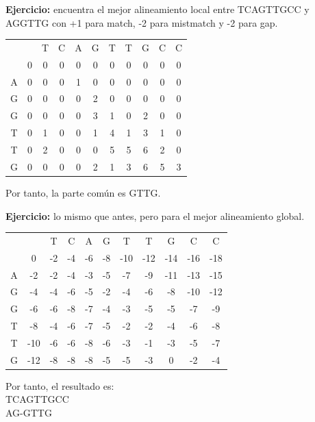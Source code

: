 \begin{table}[h]
\begin{mdframed}[backgroundcolor=black!10]
\textbf{Ejercicio:} encuentra el mejor alineamiento local entre TCAGTTGCC y AGGTTG con +1 para match, -2 para mistmatch y -2 para gap.

\begin{tabular}{c c c c c c c c c c c}
&&T&C&A&G&T&T&G&C&C\\
&0&0&0&0&0&0&0&0&0&0\\
A &0 &0&0&1&0&0&0&0&0&0\\
G &0 &0&0&0&2&0&0&0&0&0\\ 
G &0 &0&0&0&3&1&0&2&0&0\\ 
T &0 &1&0&0&1&4&1&3&1&0\\ 
T &0 &2&0&0&0&5&5&6&2&0\\ 
G &0 &0&0&0&2&1&3&6&5&3\\ 
\end{tabular}

Por tanto, la parte común es GTTG.

\textbf{Ejercicio:} lo mismo que antes, pero para el mejor alineamiento global.
\begin{tabular}{c c c c c c c c c c c}
&&T&C&A&G&T&T&G&C&C\\
&0&-2&-4&-6&-8&-10&-12&-14&-16&-18\\
A &-2 &-2&-4&-3&-5&-7&-9&-11&-13&-15\\
G &-4 &-4&-6&-5&-2&-4&-6&-8&-10&-12\\ 
G &-6 &-6&-8&-7&-4&-3&-5&-5&-7&-9\\ 
T &-8 &-4&-6&-7&-5&-2&-2&-4&-6&-8\\ 
T &-10 &-6&-6&-8&-6&-3&-1&-3&-5&-7\\ 
G &-12&-8&-8&-8&-5&-5&-3&0&-2&-4\\ 
\end{tabular}
Por tanto, el resultado es:\\
TCAGTTGCC\\
AG-GTTG
\end{mdframed}
\end{table}

